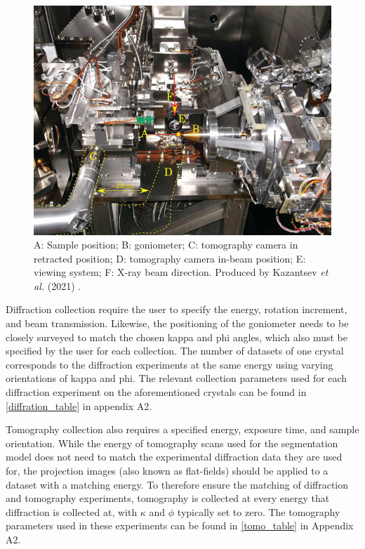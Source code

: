\begin{figure}
    \centering
    \includegraphics{images/tomo camera.png}
    \caption{A: Sample position; B: goniometer; C: tomography camera in retracted position; D: tomography camera in-beam position; E: viewing system; F: X-ray beam direction. Produced by Kazantsev \textit{et al.} (2021) \cite{Kazantsev2021}.}
    \label{fig:vacuum_chamber}
\end{figure}

Diffraction collection require the user to specify the energy, rotation increment, and beam transmission. Likewise, the positioning of the goniometer needs to be closely surveyed to match the chosen kappa and phi angles, which also must be specified by the user for each collection. The number of datasets of one crystal corresponds to the diffraction experiments at the same energy using varying orientations of kappa and phi. The relevant collection parameters used for each diffraction experiment on the aforementioned crystals can be found in \cref{diffration_table} in appendix A2.

Tomography collection also requires a specified energy, exposure time, and sample orientation. While the energy of tomography scans used for the segmentation model does not need to match the experimental diffraction data they are used for, the projection images (also known as flat-fields) should be applied to a dataset with a matching energy. To therefore ensure the matching of diffraction and tomography experiments, tomography is collected at every energy that diffraction is collected at, with $\kappa$ and $\phi$ typically set to zero. The tomography parameters used in these experiments can be found in \cref{tomo_table} in Appendix A2.

